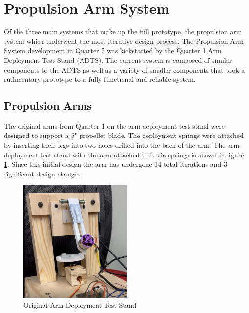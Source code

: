 \section{Propulsion Arm System}
Of the three main systems that make up the full prototype, the propulsion arm system which underwent the most iterative design process. The Propulsion Arm System development in Quarter 2 was kickstarted by the Quarter 1 Arm Deployment Test Stand (ADTS). The current system is composed of similar components to the ADTS as well as a variety of smaller components that took a rudimentary prototype to a fully functional and reliable system.
\subsection{Propulsion Arms}
The original arms from Quarter 1 on the arm deployment test stand were designed to support a 5" propeller blade. The deployment springs were attached by inserting their legs into two holes drilled into the back of the arm. The arm deployment test stand with the arm attached to it via springs is shown in figure \ref{fig:adts}. Since this initial design the arm has undergone 14 total iterations and 3 significant design changes. 

\begin{figure}
    \centering
    \includegraphics[width=0.5\textwidth]{src/figs/ADTS.png}
    \caption{Original Arm Deployment Test Stand}
    \label{fig:adts}
\end{figure}

